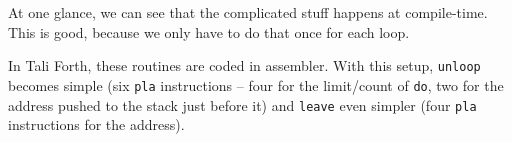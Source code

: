 At one glance, we can see that the complicated stuff happens at compile-time.
This is good, because we only have to do that once for each loop. 

In Tali Forth, these routines are coded in assembler. With this setup,
\texttt{unloop} becomes simple (six \texttt{pla} instructions -- four for the
limit/count of \texttt{do}, two for the address pushed to the stack just before
it) and \texttt{leave} even simpler (four \texttt{pla} instructions for the
address). 

